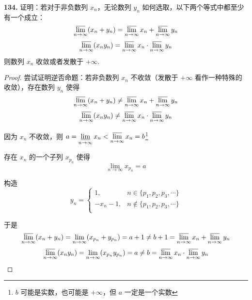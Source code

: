 \textbf{134.} 证明：若对于非负数列 $x_n$，无论数列 $y_n$ 如何选取，以下两个等式中都至少有一个成立：
\[\varlimsup_{n \rightarrow \infty}(x_n + y_n) = \varlimsup_{n \rightarrow \infty} x_n + \varlimsup_{n \rightarrow \infty} y_n\]
\[\varlimsup_{n \rightarrow \infty} (x_ny_n) = \varlimsup_{n \rightarrow \infty} x_n \cdot \varlimsup_{n \rightarrow \infty} y_n\]
则数列 $x_n$ 收敛或者发散于 $+\infty$.
\begin{proof}
    尝试证明逆否命题：若非负数列 $x_n$ 不收敛（发散于 $+\infty$ 看作一种特殊的收敛），存在数列 $y_n$ 使得
    \[\varlimsup_{n \rightarrow \infty}(x_n + y_n) \neq \varlimsup_{n \rightarrow \infty} x_n + \varlimsup_{n \rightarrow \infty} y_n\]
    \[\varlimsup_{n \rightarrow \infty} (x_ny_n) \neq \varlimsup_{n \rightarrow \infty} x_n \cdot \varlimsup_{n \rightarrow \infty} y_n\]

    因为 $x_n$ 不收敛，则 $\displaystyle a = \varliminf_{n \rightarrow \infty}x_n < \varlimsup_{n \rightarrow \infty}x_n = b$\footnote{$b$ 可能是实数，也可能是 $+\infty$，但 $a$ 一定是一个实数}

    存在 $x_n$ 的一个子列 $x_{p_n}$ 使得
    \[\lim_{n \rightarrow \infty} x_{p_n} = a\]

    构造
    \[y_n = \begin{cases}
        1, & n \in \{p_1,p_2,p_3,\cdots\}\\
        -x_n - 1, & n \notin \{p_1,p_2,p_3,\cdots\}\\
    \end{cases}\]

    于是
    \[\varlimsup_{n \rightarrow \infty}(x_n + y_n) = \lim_{n \rightarrow \infty}(x_{p_n} + y_{p_n}) = a+1 \neq b+1 = \varlimsup_{n \rightarrow \infty} x_n + \varlimsup_{n \rightarrow \infty} y_n\]
    \[\varlimsup_{n \rightarrow \infty}(x_ny_n) = \lim_{n \rightarrow \infty}(x_{p_n}y_{p_n}) = a \neq b = \varlimsup_{n \rightarrow \infty} x_n \cdot \varlimsup_{n \rightarrow \infty} y_n\]
\end{proof}\vspace{9pt}

